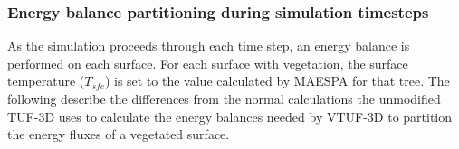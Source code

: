 \documentclass[preprint,12pt,authoryear]{elsarticle}
\begin{document}
 
 
 








%





\subsubsection{Energy balance partitioning during simulation timesteps}\label{sec:parttimestep}
As the simulation proceeds through each time step, an energy balance is performed on each surface. For each surface with vegetation, the surface temperature ($T_{sfc}$) is set to the value calculated by MAESPA for that tree. The following describe the differences from the normal calculations the unmodified TUF-3D uses to calculate the energy balances needed by VTUF-3D to partition the energy fluxes of a vegetated surface.
\end{document}
